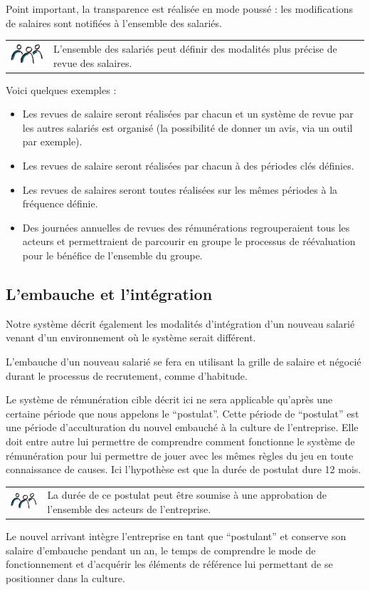 \documentclass[12pt]{article}
\newcommand{\assemblee}[1]{%
  \begin{tcolorbox}[colframe=DarkPlum,boxrule=2pt,arc=4pt,left=6pt,right=6pt,top=6pt,bottom=6pt,boxsep=0pt,colback=white]
    \begin{tabular}{m{1.5cm} m{11cm}}
      \includegraphics[width=1.5cm]{includes/team} & #1 \\
    \end{tabular}
  \end{tcolorbox}
}
\begin{document}
 Point important, la transparence est réalisée en mode poussé : les modifications de salaires sont notifiées à l’ensemble des salariés. 

 \assemblee{L’ensemble des salariés peut définir des modalités plus précise de revue des salaires. }
 Voici quelques exemples :
 \begin{itemize}
   \item Les revues de salaire seront réalisées par chacun et un système de revue par les autres salariés est organisé (la possibilité de donner un avis, via un outil par exemple).
   \item Les revues de salaire seront réalisées par chacun à des périodes clés définies. 
   \item Les revues de salaires seront toutes réalisées sur les mêmes périodes à la fréquence définie.
   \item Des journées annuelles de revues des rémunérations regrouperaient tous les acteurs et permettraient de parcourir en groupe le processus de réévaluation pour le bénéfice de l'ensemble du groupe.
 \end{itemize}

\subsection{L’embauche et l’intégration}

 Notre système décrit également les modalités d’intégration d’un nouveau salarié venant d’un environnement où le système serait différent.

 L’embauche d’un nouveau salarié se fera en utilisant la grille de salaire et négocié durant le processus de recrutement, comme d’habitude. 

 Le système de rémunération cible décrit ici ne sera applicable qu’après une certaine période que nous appelons le “postulat”. Cette période de “postulat” est une période d’acculturation du nouvel embauché à la culture de l’entreprise. Elle doit entre autre lui permettre de comprendre comment fonctionne le système de rémunération pour lui permettre de jouer avec les mêmes règles du jeu en toute connaissance de causes. Ici l’hypothèse est que la durée de postulat dure 12 mois. 

 \assemblee{La durée de ce postulat peut être soumise à une approbation de l’ensemble des acteurs de l’entreprise.}

 Le nouvel arrivant intègre l’entreprise en tant que “postulant” et conserve son salaire d’embauche pendant un an, le temps de comprendre le mode de fonctionnement et d’acquérir les éléments de référence lui permettant de se positionner dans la culture.  
\end{document}
